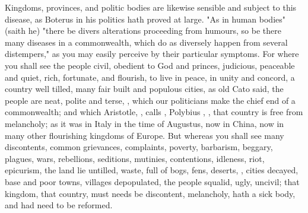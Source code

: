 Kingdoms, provinces, and politic bodies are likewise sensible and subject to
this disease, as Boterus in his politics hath proved at
large. "As in human bodies" (saith he) "there be divers alterations proceeding
from humours, so be there many diseases in a commonwealth, which do as
diversely happen from several distempers," as you may easily perceive by their
particular symptoms. For where you shall see the people civil, obedient to God
and princes, judicious, peaceable and quiet, rich, fortunate,
and flourish, to live in peace, in unity and concord, a
country well tilled, many fair built and populous cities,  as old Cato said, the people are neat, polite and
terse, , which our politicians make the chief end
of a commonwealth; and which Aristotle,
, calls ,
Polybius , , that
country is free from melancholy; as it was in Italy in the time of Augustus,
now in China, now in many other flourishing kingdoms of Europe. But whereas you
shall see many discontents, common grievances, complaints, poverty, barbarism,
beggary, plagues, wars, rebellions, seditions, mutinies, contentions, idleness,
riot, epicurism, the land lie untilled, waste, full of bogs, fens, deserts,
\etc{}, cities decayed, base and poor towns, villages depopulated, the people
squalid, ugly, uncivil; that kingdom, that country, must needs be discontent,
melancholy, hath a sick body, and had need to be reformed.

